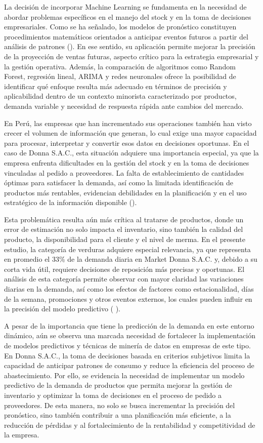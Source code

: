 La decisión de incorporar Machine Learning se fundamenta en la necesidad de abordar problemas específicos en el manejo del stock y en la toma de decisiones empresariales. Como se ha señalado, los modelos de pronóstico constituyen procedimientos matemáticos orientados a anticipar eventos futuros a partir del análisis de patrones (\cite{MINTARYA202396}). En ese sentido, su aplicación permite mejorar la precisión de la proyección de ventas futuras, aspecto crítico para la estrategia empresarial y la gestión operativa. Además, la comparación de algoritmos como Random Forest, regresión lineal, ARIMA y redes neuronales ofrece la posibilidad de identificar qué enfoque resulta más adecuado en términos de precisión y aplicabilidad dentro de un contexto minorista caracterizado por productos, demanda variable y necesidad de respuesta rápida ante cambios del mercado.

En Perú, las empresas que han incrementado sus operaciones también han visto crecer el volumen de información que generan, lo cual exige una mayor capacidad para procesar, interpretar y convertir esos datos en decisiones oportunas. En el caso de Donna S.A.C., esta situación adquiere una importancia especial, ya que la empresa enfrenta dificultades en la gestión del stock y en la toma de decisiones vinculadas al pedido a proveedores. La falta de establecimiento de cantidades óptimas para satisfacer la demanda, así como la limitada identificación de productos más rentables, evidencian debilidades en la planificación y en el uso estratégico de la información disponible (\cite{Bancomundial}).

Esta problemática resulta aún más crítica al tratarse de productos, donde un error de estimación no solo impacta el inventario, sino también la calidad del producto, la disponibilidad para el cliente y el nivel de merma. En el presente estudio, la categoría de verduras adquiere especial relevancia, ya que representa en promedio el 33\% de la demanda diaria en Market Donna S.A.C. y, debido a su corta vida útil, requiere decisiones de reposición más precisas y oportunas. El análisis de esta categoría permite observar con mayor claridad las variaciones diarias en la demanda, así como los efectos de factores como estacionalidad, días de la semana, promociones y otros eventos externos, los cuales pueden influir en la precisión del modelo predictivo ( \cite{ElMadini2024}).

A pesar de la importancia que tiene la predicción de la demanda en este entorno dinámico, aún se observa una marcada necesidad de fortalecer la implementación de modelos predictivos y técnicas de minería de datos en empresas de este tipo. En Donna S.A.C., la toma de decisiones basada en criterios subjetivos limita la capacidad de anticipar patrones de consumo y reduce la eficiencia del proceso de abastecimiento. Por ello, se evidencia la necesidad de implementar un modelo predictivo de la demanda de productos que permita mejorar la gestión de inventario y optimizar la toma de decisiones en el proceso de pedido a proveedores. De esta manera, no solo se busca incrementar la precisión del pronóstico, sino también contribuir a una planificación más eficiente, a la reducción de pérdidas y al fortalecimiento de la rentabilidad y competitividad de la empresa.

